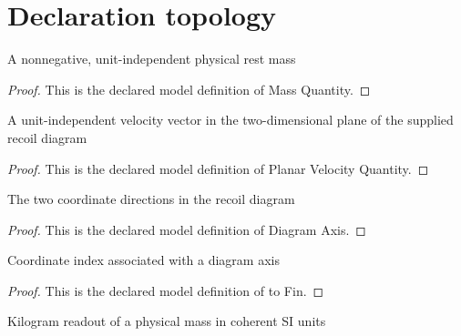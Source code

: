 \section{Declaration topology}
\begin{definition}
  \label{def:physics:phyx-mini-0618:phyxminiproblems-problemphyxmini0618-massquantity}
  A nonnegative, unit-independent physical rest mass
\end{definition}
\begin{proof}
  This is the declared model definition of Mass Quantity.
\end{proof}
\begin{definition}
  \label{def:physics:phyx-mini-0618:phyxminiproblems-problemphyxmini0618-planarvelocityquantity}
  A unit-independent velocity vector in the two-dimensional plane of the supplied recoil diagram
\end{definition}
\begin{proof}
  This is the declared model definition of Planar Velocity Quantity.
\end{proof}
\begin{definition}
  \label{def:physics:phyx-mini-0618:phyxminiproblems-problemphyxmini0618-diagramaxis}
  The two coordinate directions in the recoil diagram
\end{definition}
\begin{proof}
  This is the declared model definition of Diagram Axis.
\end{proof}
\begin{definition}[to Fin]
  \label{def:physics:phyx-mini-0618:phyxminiproblems-problemphyxmini0618-diagramaxis-tofin}
  Coordinate index associated with a diagram axis
\end{definition}
\begin{proof}
  This is the declared model definition of to Fin.
\end{proof}
\begin{definition}
  \label{def:physics:phyx-mini-0618:phyxminiproblems-problemphyxmini0618-massinkilograms}
  Kilogram readout of a physical mass in coherent SI units
\end{definition}
